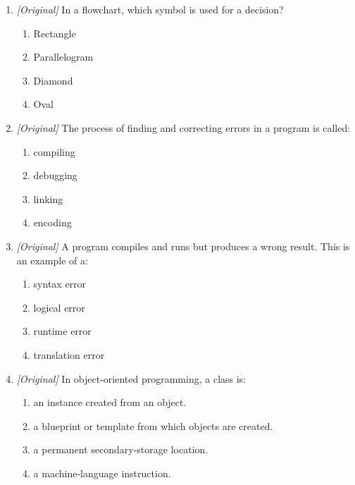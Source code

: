\documentclass[11pt]{article}
\begin{document}
\begin{enumerate}[label=\textbf{Q\arabic*.}, leftmargin=*]
  \begin{enumerate}[label=\Alph*.]
    \item a pictorial representation using standard symbols.
    \item a finite, step-by-step procedure to solve a problem.
    \item the binary code executed by the CPU.
    \item a software tool for finding errors.
  \end{enumerate}
\item \textit{[Original]} In a flowchart, which symbol is used for a decision?
  \begin{enumerate}[label=\Alph*.]
    \item Rectangle
    \item Parallelogram
    \item Diamond
    \item Oval
  \end{enumerate}
\item \textit{[Original]} The process of finding and correcting errors in a
  program is called:
  \begin{enumerate}[label=\Alph*.]
    \item compiling
    \item debugging
    \item linking
    \item encoding
  \end{enumerate}
\item \textit{[Original]} A program compiles and runs but produces a wrong
  result. This is an example of a:
  \begin{enumerate}[label=\Alph*.]
    \item syntax error
    \item logical error
    \item runtime error
    \item translation error
  \end{enumerate}
\item \textit{[Original]} In object-oriented programming, a class is:
  \begin{enumerate}[label=\Alph*.]
    \item an instance created from an object.
    \item a blueprint or template from which objects are created.
    \item a permanent secondary-storage location.
    \item a machine-language instruction.
  \end{enumerate}

\end{enumerate}
\end{document}

